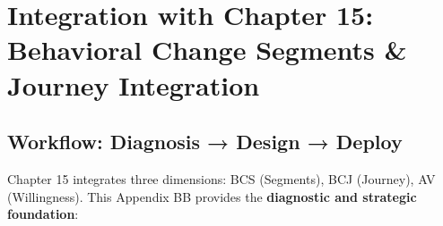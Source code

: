 \documentclass[11pt, a4paper]{article}
\begin{document}

\section{Integration with Chapter 15: Behavioral Change Segments \& Journey Integration}

\subsection{Workflow: Diagnosis → Design → Deploy}

Chapter 15 integrates three dimensions: BCS (Segments), BCJ (Journey), AV (Willingness).
This Appendix BB provides the \textbf{diagnostic and strategic foundation}:
\end{document}
